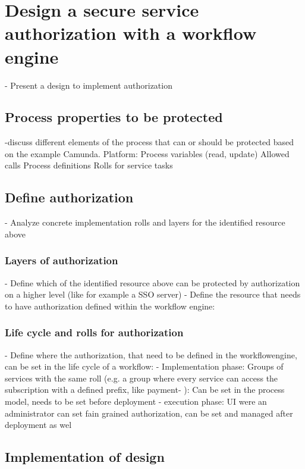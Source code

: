 \section{Design a secure service authorization with a workflow engine}\label{design}

- Present a design to implement authorization

\subsection{Process properties to be protected}\label{processPropertiesToBeProtected}
-discuss different elements of the process that can or should be protected based on the example Camunda.
Platform:
Process variables (read, update)
Allowed calls
Process definitions
Rolls for service tasks

\subsection{Define authorization}\label{defineAuthorization}
- Analyze concrete implementation rolls and layers for the identified resource above

\subsubsection{Layers of authorization}\label{layersOfAuthorization}
- Define which of the identified resource above can be protected by authorization on a higher level (like
for example a SSO server)
- Define the resource that needs to have authorization defined within the workflow engine:

\subsubsection{Life cycle and rolls for authorization}\label{lifeCycleAndRolls}
- Define where the authorization, that need to be defined in the workflowengine, can be set in the life
cycle of a workflow:
- Implementation phase: Groups of services with the same roll (e.g. a group where every service
can access the subscription with a defined prefix, like payment- ): Can be set in the process model,
needs to be set before deployment
- execution phase: UI were an administrator can set fain grained authorization, can be set and managed
after deployment as wel

\subsection{Implementation of design}\label{implementation}